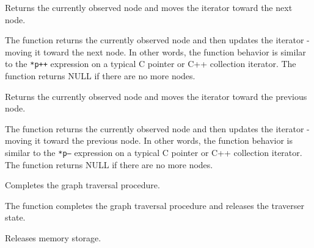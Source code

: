 
Returns the currently observed node and moves the iterator toward the next node.


\begin{description}
\end{description}


The function returns the currently observed node and then updates the
iterator - moving it toward the next node. In other words, the function
behavior is similar to the \texttt{*p++} expression on a typical C
pointer or C++ collection iterator. The function returns NULL if there
are no more nodes.



Returns the currently observed node and moves the iterator toward the previous node.


\begin{description}
\end{description}


The function returns the currently observed node and then updates
the iterator - moving it toward the previous node. In other words,
the function behavior is similar to the \texttt{*p--} expression on a
typical C pointer or C++ collection iterator. The function returns NULL
if there are no more nodes.


Completes the graph traversal procedure.


\begin{description}
\end{description}


The function completes the graph traversal procedure and releases the traverser state.



Releases memory storage.

